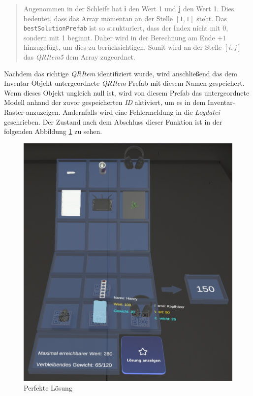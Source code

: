 \begin{quote}
Angenommen in der Schleife hat \textbf{i} den Wert 1 und \textbf{j} den Wert 1. Dies bedeutet, dass das Array momentan
an der Stelle $[1, 1]$ steht. Das \texttt{bestSolutionPrefab} ist so strukturiert, dass der Index nicht mit 0, sondern
mit 1 beginnt. Daher wird in der Berechnung am Ende $+ 1$ hinzugefügt, um dies zu berücksichtigen. Somit wird an der
Stelle $[i, j]$ das \textit{QRItem5} dem Array zugeordnet.
\end{quote}

Nachdem das richtige \textit{QRItem} identifiziert wurde, wird anschließend das dem Inventar-Objekt untergeordnete
\textit{QRItem} Prefab mit diesem Namen gespeichert. Wenn dieses Objekt ungleich null ist, wird von diesem Prefab das
untergeordnete Modell anhand der zuvor gespeicherten \textit{ID} aktiviert, um es in dem Inventar-Raster anzuzeigen.
Andernfalls wird eine Fehlermeldung in die \textit{Logdatei} geschrieben. Der Zustand nach dem Abschluss dieser Funktion
ist in der folgenden Abbildung \ref{fig:perfSolUserPOV} zu sehen.
\begin{figure}[H]
    \centering
    \includegraphics[scale=0.8]{images/perfSolUserPOV}
    \caption{Perfekte Lösung}
    \label{fig:perfSolUserPOV}
\end{figure}

